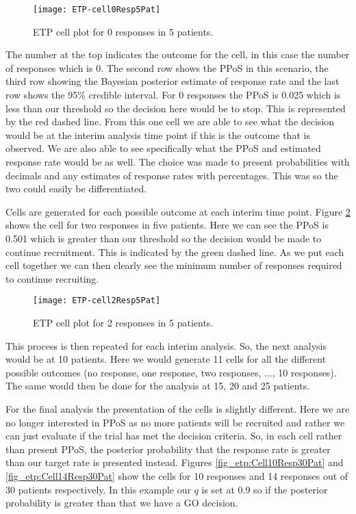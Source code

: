 \begin{figure}[h!]
	\centering
	\caption{ETP cell plot for 0 responses in 5 patients.}
	\label{fig_etp:Cell0Resp5Pat}
	\texttt{[image: ETP-cell0Resp5Pat]}
\end{figure}

The number at the top indicates the outcome for the cell, in this case the number of responses which is 0. The second row shows the PPoS in this scenario, the third row showing the Bayesian posterior estimate of response rate and the last row shows the 95\% credible interval. For 0 responses the PPoS is 0.025 which is less than our threshold so the decision here would be to stop. This is represented by the red dashed line. From this one cell we are able to see what the decision would be at the interim analysis time point if this is the outcome that is observed. We are also able to see specifically what the PPoS and estimated response rate would be as well. The choice was made to present probabilities with decimals and any estimates of response rates with percentages. This was so the two could easily be differentiated.

Cells are generated for each possible outcome at each interim time point. Figure \ref{fig_etp:Cell2Resp5Pat} shows the cell for two responses in five patients. Here we can see the PPoS is 0.501 which is greater than our threshold so the decision would be made to continue recruitment. This is indicated by the green dashed line. As we put each cell together we can then clearly see the minimum number of responses required to continue recruiting.  

\begin{figure}[h!]
	\centering
	\caption{ETP cell plot for 2 responses in 5 patients.}
	\label{fig_etp:Cell2Resp5Pat}
	\texttt{[image: ETP-cell2Resp5Pat]}
\end{figure}

This process is then repeated for each interim analysis. So, the next analysis would be at 10 patients. Here we would generate 11 cells for all the different possible outcomes (no response, one response, two responses, ..., 10 responses). The same would then be done for the analysis at 15, 20 and 25 patients. 

For the final analysis the presentation of the cells is slightly different. Here we are no longer interested in PPoS as no more patients will be recruited and rather we can just evaluate if the trial has met the decision criteria. So, in each cell rather than present PPoS, the posterior probability that the response rate is greater than our target rate is presented instead. Figures \ref{fig_etp:Cell10Resp30Pat} and \ref{fig_etp:Cell14Resp30Pat} show the cells for 10 responses and 14 responses out of 30 patients respectively. In this example our $q$ is set at 0.9 so if the posterior probability is greater than that we have a GO decision. 

